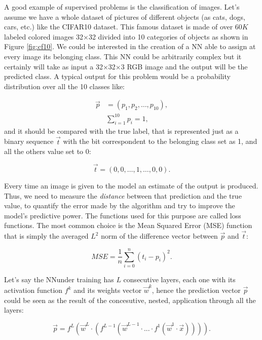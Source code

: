 A good example of supervised problems is the classification of images. Let's assume we have a whole dataset of pictures of different objects (as cats, dogs, cars, etc.) like the CIFAR10 \cite{cifar10} dataset. This famous dataset is made of over 60$K$ labeled colored images 32$\times$32 divided into 10 categories of objects as shown in Figure \ref{fig:cf10}. We could be interested in the creation of a NN able to assign at every image its belonging class. This NN could be arbitrarily complex but it certainly will take as input a 32$\times$32$\times$3 RGB image and the output will be the predicted class. A typical output for this problem would be a probability distribution over all the 10 classes like:

\begin{align}
    \vec p & = (p_1, p_2, \dots, p_{10}), \\
    &\sum_{i=1}^{10} p_i = 1,
\end{align}
and it should be compared with the true label, that is represented just as a binary sequence $\vec t$ with the bit correspondent to the belonging class set as 1, and all the others value set to 0:

\begin{equation}
    \vec t = (0,0,\dots, 1, \dots,0,0).
\end{equation}

Every time an image is given to the model an estimate of the output is produced. Thus, we need to measure the \textit{distance} between that prediction and the true value, to quantify the error made by the algorithm and try to improve the model's predictive power. The functions used for this purpose are called loss functions. The most common choice is the Mean Squared Error (MSE) function that is simply the averaged $L^2$ norm of the difference vector between $\vec p$ and $\vec t$:

\begin{equation}
    MSE = \frac{1}{n} \sum_{i=0}^{n} (t_i - p_i)^2.
    \label{eq:MSE}
\end{equation}

Let's say the NNunder training has $L$ consecutive layers, each one with its activation function $f^k$ and its weights vector $\vec w^k$, hence the prediction vector $\vec p$ could be seen as the result of the concesutive, nested, application through all the layers:

\begin{equation}
    \vec p = f^L(\vec w^L \cdot (f^{L-1}(\vec w^{L-1} \cdot ... \cdot f^1(\vec w^1 \cdot \vec x)))).
    \label{eq:neste_layers}
\end{equation}

